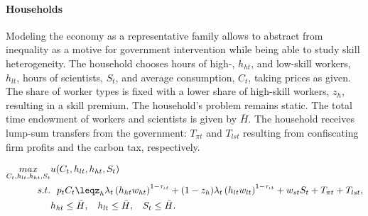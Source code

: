 \paragraph{Households}
Modeling the economy as a representative family allows to abstract from inequality as a motive for government intervention while being able to study skill heterogeneity.
The household chooses hours of high-, $h_{ht}$, and low-skill workers, $h_{lt}$, hours of scientists, $S_t$, and average consumption, $C_t$, taking prices as given. The share of worker types is fixed with a lower share of high-skill workers, $z_h$, resulting in a skill premium. The household's problem remains static. The total time endowment of workers and scientists is given by $\bar{H}$. %
The household receives lump-sum transfers from the government: $T_{\pi t}$ and $T_{lst}$ resulting from confiscating firm profits and the carbon tax, respectively.

\begin{align*}
\underset{C_{t}, h_{lt}, h_{ht}, S_t}{max}&
u(C_{t}, h_{lt}, h_{ht}, S_t)\\
s.t.& \ \ p_{t}C_{t}\leq%
z_h\lambda_t \left(h_{ht}w_{ht}\right)^{1-\tau_{\iota t}}+(1-z_h)\lambda_t\left(h_{lt}w_{lt}\right)^{1-\tau_{\iota t}}+w_{st}S_t+T_{\pi t}+T_{lst},\\
\ & h_{ht}\leq \bar{H},\ \hspace{2mm} h_{lt}\leq \bar{H},\ \hspace{2mm}  S_{t}\leq \bar{H}.
\end{align*}



